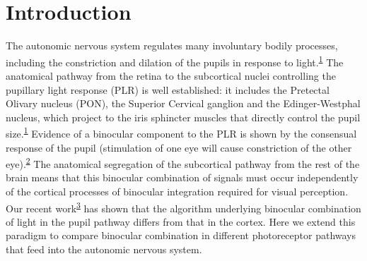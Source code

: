\documentclass[
]{article}
\begin{document}
\hypertarget{introduction}{%
\section{Introduction}\label{introduction}}

The autonomic nervous system regulates many involuntary bodily processes, including the constriction and dilation of the pupils in response to light.\textsuperscript{\protect\hyperlink{ref-McDougal2015}{1}} The anatomical pathway from the retina to the subcortical nuclei controlling the pupillary light response (PLR) is well established: it includes the Pretectal Olivary nucleus (PON), the Superior Cervical ganglion and the Edinger-Westphal nucleus, which project to the iris sphincter muscles that directly control the pupil size.\textsuperscript{\protect\hyperlink{ref-McDougal2015}{1}} Evidence of a binocular component to the PLR is shown by the consensual response of the pupil (stimulation of one eye will cause constriction of the other eye).\textsuperscript{\protect\hyperlink{ref-Wyatt1981}{2}} The anatomical segregation of the subcortical pathway from the rest of the brain means that this binocular combination of signals must occur independently of the cortical processes of binocular integration required for visual perception. Our recent work\textsuperscript{\protect\hyperlink{ref-Segala2023}{3}} has shown that the algorithm underlying binocular combination of light in the pupil pathway differs from that in the cortex. Here we extend this paradigm to compare binocular combination in different photoreceptor pathways that feed into the autonomic nervous system.
\end{document}
